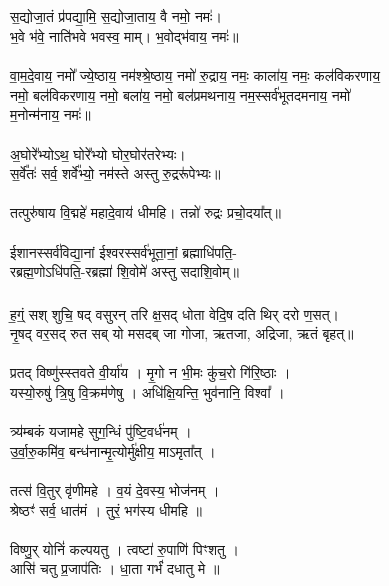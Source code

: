 \subsection{}
स॒द्योजा॒तं प्र॑पद्या॒मि॒ स॒द्योजा॒ताय॒ वै नमो॒ नमः॑। \\
भ॒वे भ॑वे॒ नाति॑भवे भवस्व॒ माम्। भ॒वोद्भ॑वाय॒ नमः॑॥\\
\\
वा॒म॒दे॒वाय॒ नमो᳚ ज्ये॒ष्ठाय॒ नम॑श्श्रे॒ष्ठाय॒ नमो॑ रु॒द्राय॒ नमः॒ काला॑य॒ नमः॒ कल॑विकरणाय॒\\
नमो॒ बल॑विकरणाय॒ नमो॒ बला॑य॒ नमो॒ बल॑प्रमथनाय॒ नम॒स्सर्व॑भूतदमनाय॒ नमो॑\\
म॒नोन्म॑नाय॒ नमः॑॥\\
\\
अ॒घोरे᳚भ्योऽथ॒ घोरे᳚भ्यो घोर॒घोर॑तरेभ्यः। \\
स॒र्वे᳚तः॑ सर्व॒ शर्वे᳚भ्यो॒ नम॑स्ते अस्तु रु॒द्ररू॑पेभ्यः॥\\
\\
तत्पुरु॑षाय वि॒द्महे॑ महादे॒वाय॑ धीमहि। तन्नो॑ रुद्रः प्रचो॒दया᳚त्॥\\
\\
ईशानस्सर्व॑विद्या॒नां ईश्वरस्सर्व॑भूता॒नां॒ ब्रह्माधि॑पति॒-\\
रब्रह्म॒णोऽधि॑पति॒-रब्रह्मा॑ शि॒वोमे॑ अस्तु सदाशि॒वोम्॥\\
\subsubsection{}
ह॒ग्ं॒ सश् शुचि॒ षद् वसुरन् तरि क्ष॒सद् धोता वेदि॒ष दति थिर् दरो ण॒सत्।\\
नृ॒षद् वर॒सद् रुत सब् यो मसदब् जा गोजा, ऋतजा, अद्रिजा, ऋतं बृहत्॥ \\
\\
प्रतद् विष्णु॑स्स्तवते वी॒र्या॑य । मृ॒गो न भी॒मः कु॑च॒रो गि॑रि॒ष्ठाः । \\
यस्यो॒रुषु॑ त्रि॒षु वि॒क्रम॑णेषु । अधि॑क्षि॒यन्ति॒ भुव॑नानि॒ विश्वा᳚  । \\
\\
त्र्य॑म्बकं यजामहे सुग॒न्धिं पु॑ष्टि॒वर्ध॑नम् ।\\
उ॒र्वा॒रु॒कमि॑व॒ बन्ध॑नान्मृ॒त्योर्मु॑क्षीय॒ माऽमृता᳚त् ।\\
\\
तत्स॑ वि॒तुर् वृ॑णीमहे । व॒यं दे॒वस्य॒ भोज॑नम् । \\
श्रेष्ठꣳ॑  सर्व॒ धात॑मं । तुरं॒ भग॑स्य धीमहि ॥\\
\\
विष्णु॒र् योनिं॑ कल्पयतु । त्वष्टा॑ रु॒पाणि॑ पिꣳशतु । \\
आसि॑ चतु प्र॒जाप॑तिः । धा॒ता गर्भं॑ दधातु मे ॥\\
